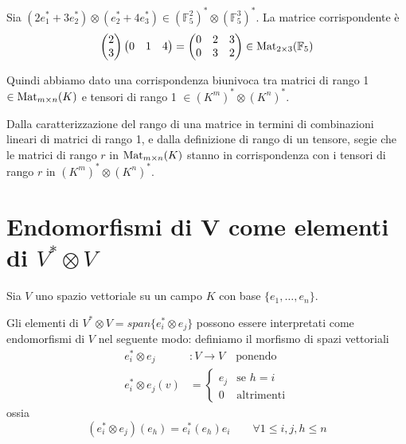 \documentclass[../main.tex]{subfiles}
\begin{document}
\begin{example}
    Sia $(2 e_1^* + 3 e_2^*) \otimes (e_2^* + 4 e_3^*) \in (\mathbb{F}_5^2)^* \otimes (\mathbb{F}_5^3)^*$. La matrice corrispondente è
    \begin{equation*}
        \begin{pmatrix}
            2 \\
            3
        \end{pmatrix} \begin{pmatrix}
            0 & 1 & 4 \\
        \end{pmatrix} = \begin{pmatrix}
            0 & 2 & 3 \\
            0 & 3 & 2
        \end{pmatrix} \in \operatorname{Mat}_{2 \times 3}(\mathbb{F}_5)
    \end{equation*}
\end{example}

Quindi abbiamo dato una corrispondenza biunivoca tra matrici di rango 1 $\in \operatorname{Mat}_{m \times n}(K)$ e tensori di rango 1 $\in (K^m)^* \otimes (K^n)^*$.

Dalla caratterizzazione del rango di una matrice in termini di combinazioni lineari di matrici di rango 1, e dalla definizione di rango di un tensore, segie che le matrici di rango $r$ in $\operatorname{Mat}_{m \times n}(K)$ stanno in corrispondenza con i tensori di rango $r$ in $(K^m)^* \otimes (K^n)^*$.

\section[Endomorfismi di V come elementi del prodotto tensoriale]{Endomorfismi di V come elementi di $V^* \otimes V$}

Sia $V$ uno spazio vettoriale su un campo $K$ con base $\{e_1,\ldots, e_n\}$.

Gli elementi di $V^* \otimes V = span\{e_i^* \otimes e_j\}$ possono essere interpretati come endomorfismi di $V$ nel seguente modo:
definiamo il morfismo di spazi vettoriali
\begin{align*}
    e_i^* \otimes e_j     & : V \rightarrow V \quad \text{ponendo} \\
    e_i^* \otimes e_j (v) & = \begin{cases}
                                  e_j & \text{se } h = i  \\
                                  0   & \text{altrimenti}
                              \end{cases}
\end{align*}
ossia
\begin{equation*}
    (e_i^* \otimes e_j)(e_h) = e_i^* (e_h) e_i \qquad \forall 1 \leq i,j,h \leq n
\end{equation*}
\end{document}
